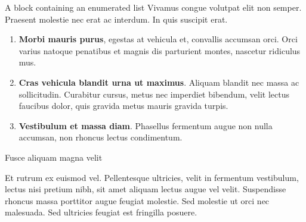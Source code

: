 \begin{columns}[t]
\begin{column}{\colwidth}
\begin{block}{A block containing an enumerated list}
    Vivamus congue volutpat elit non semper. Praesent molestie nec erat ac
    interdum. In quis suscipit erat.

    \begin{enumerate}
      \item \textbf{Morbi mauris purus}, egestas at vehicula et, convallis
        accumsan orci. Orci varius natoque penatibus et magnis dis parturient
        montes, nascetur ridiculus mus.
      \item \textbf{Cras vehicula blandit urna ut maximus}. Aliquam blandit nec
        massa ac sollicitudin. Curabitur cursus, metus nec imperdiet bibendum,
        velit lectus faucibus dolor, quis gravida metus mauris gravida turpis.
      \item \textbf{Vestibulum et massa diam}. Phasellus fermentum augue non
        nulla accumsan, non rhoncus lectus condimentum.
    \end{enumerate}

  \end{block}

  \begin{block}{Fusce aliquam magna velit}

    Et rutrum ex euismod vel. Pellentesque ultricies, velit in fermentum
    vestibulum, lectus nisi pretium nibh, sit amet aliquam lectus augue vel
    velit. Suspendisse rhoncus massa porttitor augue feugiat molestie. Sed
    molestie ut orci nec malesuada. Sed ultricies feugiat est fringilla
    posuere.


\end{block}
\end{column}
\end{columns}
